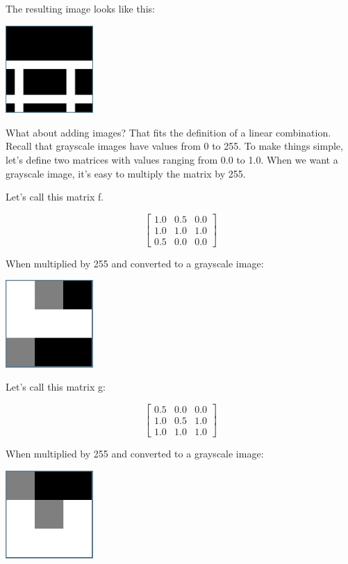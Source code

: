 The resulting image looks like this:

\includegraphics[width=0.25\textwidth]{transpose.png}

What about adding images? That fits the definition of a linear combination. Recall that grayscale images have values from 0 to 255. To make things simple, let's define two matrices with values ranging from 0.0 to 1.0. When we want a grayscale image, it's easy to multiply the matrix by 255. 

Let's call this matrix f.

$$\begin{bmatrix}
1.0 & 0.5 & 0.0\\
1.0 & 1.0 & 1.0\\
0.5 & 0.0 & 0.0 
\end{bmatrix}$$

When multiplied by 255 and converted to a grayscale image:

\includegraphics[width=0.25\textwidth]{fBitmap.png}

Let's call this matrix g:

$$\begin{bmatrix}
0.5 & 0.0 & 0.0\\
1.0 & 0.5 & 1.0\\
1.0 & 1.0 & 1.0 
\end{bmatrix}$$

When multiplied by 255 and converted to a grayscale image:

\includegraphics[width=0.25\textwidth]{gBitmap.png}

